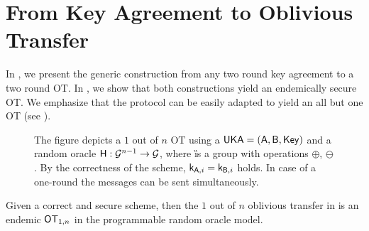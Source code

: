\section{From Key Agreement to Oblivious Transfer}\label{sec:endemicOT}

In , we present the generic construction from any two round key agreement to a two round OT. In , we show that both constructions yield an endemically secure OT. We emphasize that the protocol can be easily adapted to yield an all but one OT (see ).



\begin{figure}
\centering
{}
\myvspace{-0.3cm}
\caption{The figure depicts a $1$ out of $n$ OT using a $\mathsf{UKA}=(\mathsf{A},\mathsf{B},\mathsf{Key})$ and a random oracle $\mathsf{H}:\mathcal{G}^{n-1}\rightarrow\mathcal{G}$, where \G is a group with operations $\oplus$, $\ominus$. By the correctness of the \UKA scheme, $\mathsf{k}_{\mathsf{A},i}=\mathsf{k}_{\mathsf{B},i}$ holds. In case of a one-round \UKA the messages can be sent simultaneously.}
\label{fig:KAtoOT}
\end{figure}


 
\begin{theorem}\label{thm:KAtoOT}

Given a correct and secure \UKA scheme, then the $1$ out of $n$ oblivious transfer in    is an endemic $\mathsf{OT}_{1,n}$ in the programmable random oracle model. 

\end{theorem}

